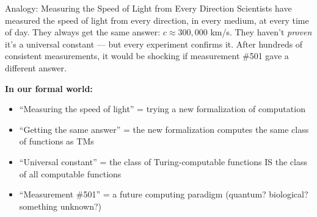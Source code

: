 \documentclass[11pt,a4paper]{article}
\begin{document}
\begin{notebox}{Analogy: Measuring the Speed of Light from Every Direction}
Scientists have measured the speed of light from every direction, in every medium, at every time of day. They always get the same answer: $c \approx 300{,}000$ km/s. They haven't \textit{proven} it's a universal constant --- but every experiment confirms it. After hundreds of consistent measurements, it would be shocking if measurement \#501 gave a different answer.

\textbf{In our formal world:}
\begin{itemize}[nosep]
\item ``Measuring the speed of light'' = trying a new formalization of computation
\item ``Getting the same answer'' = the new formalization computes the same class of functions as TMs
\item ``Universal constant'' = the class of Turing-computable functions IS the class of all computable functions
\item ``Measurement \#501'' = a future computing paradigm (quantum? biological? something unknown?)
\end{itemize}
\end{notebox}
\end{document}

